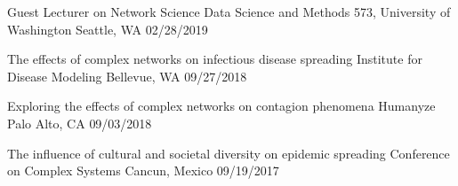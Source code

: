 \begin{cventries}
  \cvpresentation
    {Guest Lecturer on Network Science} %
    {Data Science and Methods 573, University of Washington} %
    {Seattle, WA} %
    {02/28/2019} %

  \cvpresentation
    {The effects of complex networks on infectious disease spreading} %
    {Institute for Disease Modeling} %
    {Bellevue, WA} %
    {09/27/2018} %

  \cvpresentation
    {Exploring the effects of complex networks on contagion phenomena} %
    {Humanyze} %
    {Palo Alto, CA} %
    {09/03/2018} %
    
  \cvpresentation
    {The influence of cultural and societal diversity on epidemic spreading} %
    {Conference on Complex Systems} %
    {Cancun, Mexico} %
    {09/19/2017} %
    
\end{cventries}



